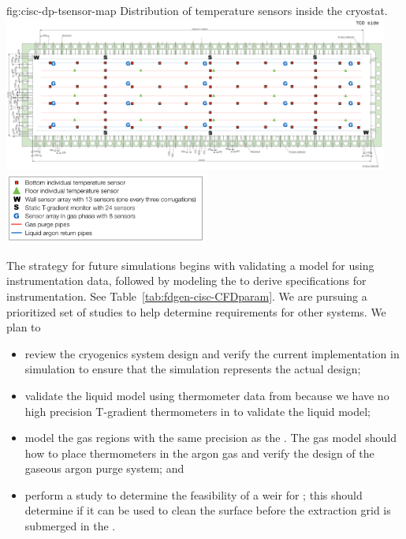 \begin{dunefigure}{fig:cisc-dp-tsensor-map}
  {Distribution of temperature sensors inside the cryostat.}
  \includegraphics[width=0.95\textwidth]{graphics/cisc_dp_tsensor_map_crop.png}
  \includegraphics[width=0.50\textwidth]{graphics/cisc_dp_tsensor_map_legend.png}
\end{dunefigure}


The strategy for future  simulations begins with
validating a  model for  using  \lar instrumentation data, followed by modeling the   to derive specifications for instrumentation.  See Table~\ref{tab:fdgen-cisc-CFDparam}.
We are pursuing a prioritized set of studies to help determine requirements for other systems. We plan to 
\begin{itemize}
\item review the    cryogenics system design and verify the current implementation in simulation %
to ensure that the simulation represents the actual design;
\item validate the liquid  model using thermometer data from  because we have no high precision T-gradient thermometers in  to validate the liquid model; 
\item model the  gas regions with the same precision as the . The gas model should how to place thermometers in the argon gas and verify the design of the gaseous argon purge system; and
\item perform a  study to determine the feasibility of a weir 
for ; this should determine if it can be used to clean the  surface before the extraction grid is submerged in the .
\end{itemize}


